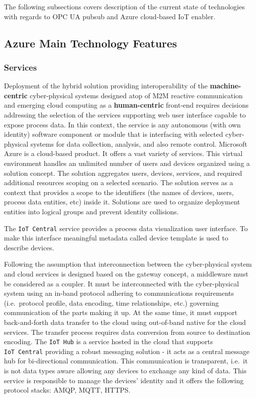 \documentclass{jacsart}
\begin{document}
The following subsections covers description of the current state of technologies with regards to OPC UA pubsub and Azure cloud-based IoT enabler.

\hypertarget{azure-main-technology-features}{%
\subsection{Azure Main Technology Features}\label{azure-main-technology-features}}

\hypertarget{services}{%
\subsubsection{Services}\label{services}}

Deployment of the hybrid solution providing interoperability of the
\textbf{machine-centric} cyber-physical systems designed atop of M2M
reactive communication and emerging cloud computing as a
\textbf{human-centric} front-end requires decisions addressing the
selection of the services supporting web user interface capable to
expose process data. In this context, the service is any
autonomous (with own identity) software component or module that is
interfacing with selected cyber-physical systems for data collection,
analysis, and also remote control. Microsoft Azure is a cloud-based
product. It offers a vast variety of services. This virtual environment
handles an unlimited number of users and devices organized using a
solution concept. The solution aggregates users, devices, services, and
required additional resources scoping on a selected scenario. The
solution serves as a context that provides a scope to the identifiers
(the names of devices, users, process data entities, etc) inside it.
Solutions are used to organize deployment entities into logical groups
and prevent identity collisions.

The \texttt{IoT\ Central} service provides a process data visualization
user interface. To make this interface meaningful metadata called device
template is used to describe devices.

Following the assumption that interconnection between the cyber-physical
system and cloud services is designed based on the gateway concept, a
middleware must be considered as a coupler. It must be interconnected
with the cyber-physical system using an in-band protocol adhering to
communications requirements (i.e.~protocol profile, data encoding, time
relationships, etc.) governing communication of the parts making it up.
At the same time, it must support back-and-forth data transfer to the
cloud using out-of-band native for the cloud services. The transfer
process requires data conversion from source to destination encoding.
The \texttt{IoT\ Hub} is a service hosted in the cloud that supports
\texttt{IoT\ Central} providing a robust messaging solution - it acts as
a central message hub for bi-directional communication. This
communication is transparent, i.e.~it is not data types aware allowing
any devices to exchange any kind of data. This service is responsible to
manage the devices' identity and it offers the following protocol
stacks: AMQP, MQTT, HTTPS.
\end{document}
